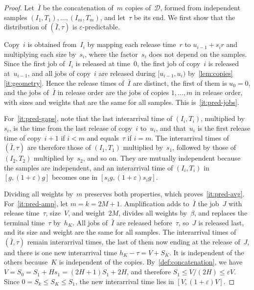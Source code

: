 \documentclass[11pt,letterpaper]{article}
\theoremstyle{definition}
\theoremstyle{remark}
\newcommand{\eps}{\varepsilon}
\newcommand{\cD}{\mathcal{D}}
\begin{document}
\begin{proof}
Let~$\bar I$ be the concatenation of~$m$ copies of~$\cD$, formed from independent samples $(I_1,T_1),\dots,(I_m,T_m)$, and let~$\tau$ be its end. We first show that the distribution of $(\bar I,\tau)$ is $\eps$-predictable.

Copy~$i$ is obtained from~$I_i$ by mapping each release time~$r$ to $u_{i-1}+s_ir$ and multiplying each size by~$s_i$, where the factor~$s_i$ does not depend on the samples. Since the first job of~$I_i$ is released at time~$0$, the first job of copy~$i$ is released at~$u_{i-1}$, and all jobs of copy~$i$ are released during $[u_{i-1},u_i)$ by~\cref{lem:copies}\ref{it:geometry}. Hence the release times of~$\bar I$ are distinct, the first of them is $u_0=0$, and the jobs of~$\bar I$ in release order are the jobs of copies $1,\dots,m$ in release order, with sizes and weights that are the same for all samples. This is~\ref{it:pred-jobs}.

For~\ref{it:pred-gaps}, note that the last interarrival time of $(I_i,T_i)$, multiplied by~$s_i$, is the time from the last release of copy~$i$ to~$u_i$, and that~$u_i$ is the first release time of copy~$i+1$ if $i<m$ and equals~$\tau$ if $i=m$. The interarrival times of $(\bar I,\tau)$ are therefore those of $(I_1,T_1)$ multiplied by~$s_1$, followed by those of $(I_2,T_2)$ multiplied by~$s_2$, and so on. They are mutually independent because the samples are independent, and an interarrival time of $(I_i,T_i)$ in $[g,(1+\eps)g]$ becomes one in $[s_ig,(1+\eps)s_ig]$.

Dividing all weights by~$m$ preserves both properties, which proves~\ref{it:pred-avg}. For~\ref{it:pred-amp}, let $m=k=2M+1$. Amplification adds to~$\bar I$ the job~$J$ with release time~$\tau$, size~$V$, and weight~$2M$, divides all weights by~$\beta$, and replaces the terminal time~$\tau$ by~$h_K$. All jobs of~$\bar I$ are released before~$\tau$, so~$J$ is released last, and its size and weight are the same for all samples. The interarrival times of $(\bar I,\tau)$ remain interarrival times, the last of them now ending at the release of~$J$, and there is one new interarrival time $h_K-\tau=V+S_K$. It is independent of the others because~$K$ is independent of the copies. By~\cref{def:concatenation}, we have $V=S_0=S_1+Hs_1=(2H+1)S_1+2H$, and therefore $S_1\le V/(2H)\le\eps V$. Since $0=S_k\le S_K\le S_1$, the new interarrival time lies in $[V,(1+\eps)V]$.
\end{proof}
\end{document}
